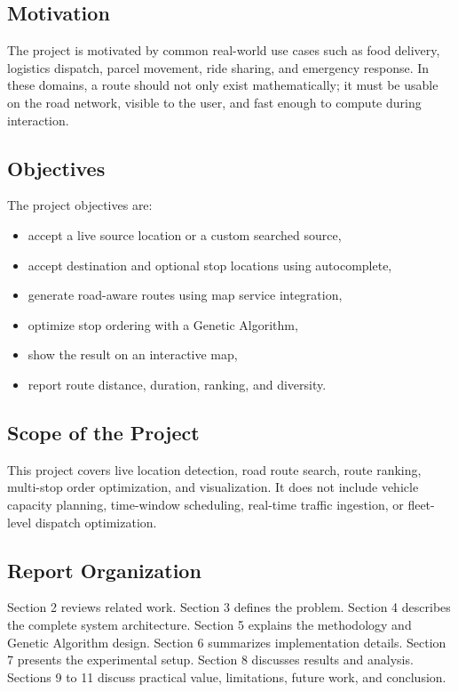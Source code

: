 \subsection{Motivation}
The project is motivated by common real-world use cases such as food delivery, logistics dispatch, parcel movement, ride sharing, and emergency response. In these domains, a route should not only exist mathematically; it must be usable on the road network, visible to the user, and fast enough to compute during interaction.

\subsection{Objectives}
The project objectives are:
\begin{itemize}[leftmargin=1.5em]
    \item accept a live source location or a custom searched source,
    \item accept destination and optional stop locations using autocomplete,
    \item generate road-aware routes using map service integration,
    \item optimize stop ordering with a Genetic Algorithm,
    \item show the result on an interactive map,
    \item report route distance, duration, ranking, and diversity.
\end{itemize}

\subsection{Scope of the Project}
This project covers live location detection, road route search, route ranking, multi-stop order optimization, and visualization. It does not include vehicle capacity planning, time-window scheduling, real-time traffic ingestion, or fleet-level dispatch optimization.

\subsection{Report Organization}
Section 2 reviews related work. Section 3 defines the problem. Section 4 describes the complete system architecture. Section 5 explains the methodology and Genetic Algorithm design. Section 6 summarizes implementation details. Section 7 presents the experimental setup. Section 8 discusses results and analysis. Sections 9 to 11 discuss practical value, limitations, future work, and conclusion.

